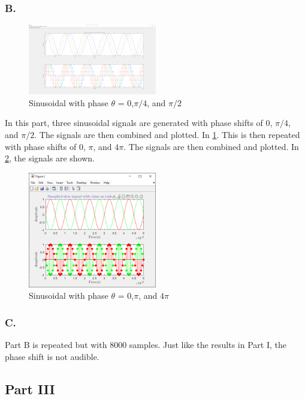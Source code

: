 \documentclass{article}
\begin{document}
\subsubsection*{B.}
\begin{figure}[H]
	\centering
	\includegraphics[width=0.5\textwidth]{fig 2b1.png}
	\caption{Sinusoidal with phase $\theta$ = 0,$\pi/4$, and $\pi/2$}
	\label{fig:fig5}
\end{figure}
In this part, three sinusoidal signals are generated with phase shifts of 0, $\pi/4$,
and $\pi/2$. The signals are then combined and plotted. In \ref{fig:fig5}. This is then
repeated with phase shifts of 0, $\pi$, and $4\pi$. The signals are then combined and 
plotted. In \ref{fig:fig6}, the signals are shown. 

\begin{figure}[H]
	\centering
	\includegraphics[width=0.5\textwidth]{fig 2b2.png}
	\caption{Sinusoidal with phase $\theta$ = 0,$\pi$, and $4\pi$}
	\label{fig:fig6}
\end{figure}

\subsubsection*{C.}
Part B is repeated but with 8000 samples. Just like the results in Part I,
the phase shift is not audible.

\subsection*{Part III}
\end{document}
